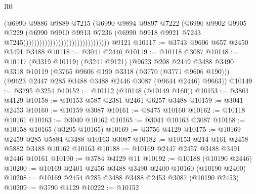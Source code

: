 \begin{lexlean}{R0}
\begin{coremodule}
                                                          (@6990
                                                            @9886
                                                            @9889
                                                            @7215
                                                            (@6990
                                                              @9894
                                                              @9897
                                                              @7222
                                                              (@6990
                                                                @9902
                                                                @9905
                                                                @7229
                                                                (@6990
                                                                  @9910
                                                                  @9913
                                                                  @7236
                                                                  (@6990
                                                                    @9918
                                                                    @9921
                                                                    @7243
                                                                    @7245))))))))))))))))))))))))))))))))
    @9121
@10117 := @3743 @9606 @657 @2450 @3491 @3488
@10118 := @3041 @2446
@10119 := @10118 @3087
@10148 := @10117
    (@3319 @10119)
    (@3241 @9121)
    (@9623
      @208
      @2449
      @3488
      @3490
      @3318
      @10119
      (@3765 @9606 @190 @3318 (@3770 (@3771 @9606 @190)))
      (@9623 @2447 @285 @3488 @3488 @2446 @3087 (@9644 @2446) @9663))
@10149 := @3795 @3254
@10152 := @10112 (@10148 (@10149 @160))
@10153 := @3801 @4129
@10158 := @10153 @587 @2381 @2461 @6257 @3488
@10159 := @3041 @2453
@10160 := @10159 @3087
@10161 := @8475 @10160
@10162 := @10118 @10161
@10163 := @3040 @10162
@10165 := @3041 @10163 @3087
@10168 := @10158 @10165 (@3295 @10165)
@10169 := @3756 @4129
@10175 := @10169 @2459 @285 @5884 @3488 @10163 @3087
@10182 := @10153 @214 @161 @2458 @5882 @3488 @10162 @10163
@10188 := @10169 @2447 @2457 @3488 @3491 @2446 @10161
@10190 := @3784 @4129 @11
@10192 := @10188 (@10190 @2446)
@10200 := @10169 @2401 @2456 @3488 @3490 @2400 @10160 (@10190 @2400)
@10208 := @10169 @2454 @285 @3488 @3488 @2453 @3087 (@10190 @2453)
@10209 := @3790 @4129
@10222 := @10152

\end{coremodule}
\end{lexlean}
